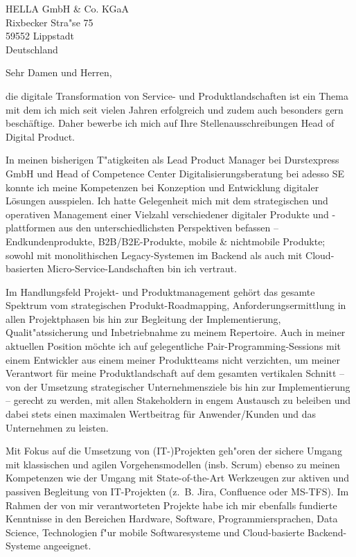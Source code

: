 \documentclass[10pt,a4paper]{dinbrief}
\date{\today}
\begin{document}
 
\begin{letter}  
{%
    HELLA GmbH \& Co. KGaA\\
    Rixbecker Stra"se 75\\
    59552 Lippstadt\\
	Deutschland
}
\subject{\bf Bewerbung Head of Digital Product (HGS/90099160)}
\opening{Sehr Damen und Herren,}
die digitale Transformation von Service- und Produktlandschaften ist ein Thema mit dem ich mich seit vielen Jahren erfolgreich und zudem auch besonders gern beschäftige. Daher bewerbe ich mich auf Ihre Stellenausschreibungen Head of Digital Product.

In meinen bisherigen T"atigkeiten als Lead Product Manager bei Durstexpress GmbH und Head of Competence Center  Digitalisierungsberatung bei adesso SE konnte ich meine Kompetenzen bei Konzeption und Entwicklung digitaler Lösungen ausspielen. Ich hatte Gelegenheit mich mit dem strategischen und operativen Management einer Vielzahl verschiedener digitaler Produkte und -plattformen aus den unterschiedlichsten Perspektiven befassen -- Endkundenprodukte, B2B/B2E-Produkte, mobile \& nichtmobile Produkte; sowohl mit monolithischen Legacy-Systemen im Backend als auch mit Cloud-basierten Micro-Service-Landschaften bin ich vertraut.

Im Handlungsfeld Projekt- und Produktmanagement gehört das gesamte Spektrum vom strategischen Produkt-Roadmapping, Anforderungsermittlung in allen Projektphasen bis hin zur Begleitung der Implementierung, Qualit"atssicherung und Inbetriebnahme zu meinem Repertoire. Auch in meiner aktuellen Position möchte ich auf gelegentliche Pair-Programming-Sessions mit einem Entwickler aus einem meiner Produktteams nicht verzichten, um meiner Verantwort für meine Produktlandschaft auf dem gesamten vertikalen Schnitt -- von der Umsetzung strategischer Unternehmensziele bis hin zur Implementierung -- gerecht zu werden, mit allen Stakeholdern in engem Austausch zu beleiben und dabei stets einen maximalen Wertbeitrag für Anwender/Kunden und das Unternehmen zu leisten.

Mit Fokus auf die Umsetzung von (IT-)Projekten geh"oren der sichere Umgang mit klassischen und agilen Vorgehensmodellen (insb. Scrum) ebenso zu meinen Kompetenzen wie der Umgang mit State-of-the-Art Werkzeugen zur aktiven und passiven Begleitung von IT-Projekten (z.~B. Jira, Confluence oder MS-TFS). Im Rahmen der von mir verantworteten Projekte habe ich mir ebenfalls fundierte Kenntnisse in den Bereichen Hardware, Software, Programmiersprachen, Data Science, Technologien f"ur mobile Softwaresysteme und Cloud-basierte Backend-Systeme angeeignet.\newpage


\end{letter}
\end{document}
